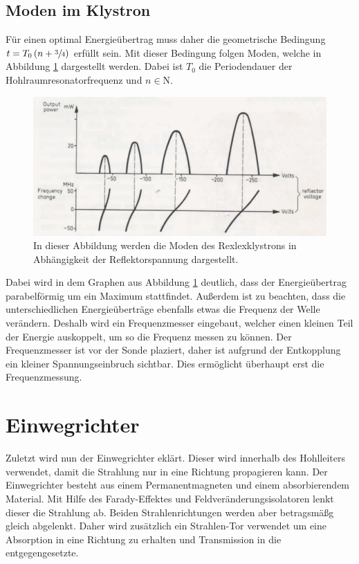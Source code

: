 \subsection{Moden im Klystron}
\label{subsec:moden}
Für einen optimal Energieübertrag muss daher die geometrische Bedingung $t = T_0\left(n+\sfrac{3}{4}\right)$ erfüllt sein. Mit dieser Bedingung folgen Moden, welche in Abbildung 
\ref{fig:moden} dargestellt werden.  Dabei ist $T_0$ die Periodendauer der Hohlraumresonatorfrequenz und $n \in \mathrm{N}$.

\begin{figure}
              \centering
              \includegraphics[width = .9\textwidth]{content/moden.PNG}
              \caption{In dieser Abbildung werden die Moden des Rexlexklystrons in Abhängigkeit der Reflektorspannung dargestellt.}
              \label{fig:moden}
\end{figure}

Dabei wird in dem Graphen aus Abbildung \ref{fig:moden} deutlich, dass der Energieübertrag parabelförmig um ein Maximum stattfindet. Außerdem ist zu beachten, dass die unterschiedlichen Energieüberträge 
ebenfalls etwas die Frequenz der Welle verändern. Deshalb wird ein Frequenzmesser eingebaut, welcher einen kleinen Teil der Energie auskoppelt, um so die Frequenz messen zu können.
Der Frequenzmesser ist vor der Sonde plaziert, daher ist aufgrund der Entkopplung ein kleiner Spannungseinbruch sichtbar. Dies ermöglicht überhaupt erst die Frequenzmessung.

\section{Einwegrichter}
\label{sec:einwegrichter}

Zuletzt wird nun der Einwegrichter eklärt. Dieser wird innerhalb des Hohlleiters verwendet, damit die Strahlung nur in eine Richtung propagieren kann. Der Einwegrichter besteht aus 
einem Permanentmagneten und einem absorbierendem Material. Mit Hilfe des Farady-Effektes und Feldveränderungsisolatoren lenkt dieser die Strahlung ab. Beiden Strahlenrichtungen werden aber betragsmäßg gleich abgelenkt. Daher wird zusätzlich ein 
Strahlen-Tor verwendet um eine Absorption in eine Richtung zu erhalten und Transmission in die entgegengesetzte.

